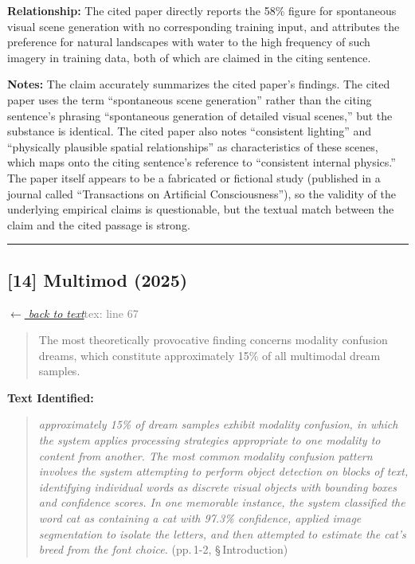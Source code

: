 \smallskip
\noindent \textbf{Relationship:} The cited paper directly reports the 58\% figure for spontaneous visual scene generation with no corresponding training input, and attributes the preference for natural landscapes with water to the high frequency of such imagery in training data, both of which are claimed in the citing sentence.

\smallskip
\noindent \textbf{Notes:} The claim accurately summarizes the cited paper's findings. The cited paper uses the term ``spontaneous scene generation'' rather than the citing sentence's phrasing ``spontaneous generation of detailed visual scenes,'' but the substance is identical. The cited paper also notes ``consistent lighting'' and ``physically plausible spatial relationships'' as characteristics of these scenes, which maps onto the citing sentence's reference to ``consistent internal physics.'' The paper itself appears to be a fabricated or fictional study (published in a journal called ``Transactions on Artificial Consciousness''), so the validity of the underlying empirical claims is questionable, but the textual match between the claim and the cited passage is strong.

\medskip
\noindent\rule{\textwidth}{0.2pt}
\medskip
\subsection*{[14] Multimod (2025)}
\hypertarget{appendix:group_67_147}{}

\noindent \hyperlink{claim:group_67_147}{\textit{$\leftarrow$ back to text}}\hfill \textcolor{gray}{tex: line 67}
\smallskip

\begin{quote}
The most theoretically provocative finding concerns modality confusion dreams, which constitute approximately 15\% of all multimodal dream samples.
\end{quote}
\noindent{}
\smallskip

\noindent \textbf{Text Identified:}
\begin{quote}
\textit{approximately 15\% of dream samples exhibit modality confusion, in which the system applies processing strategies appropriate to one modality to content from another. The most common modality confusion pattern involves the system attempting to perform object detection on blocks of text, identifying individual words as discrete visual objects with bounding boxes and confidence scores. In one memorable instance, the system classified the word cat as containing a cat with 97.3\% confidence, applied image segmentation to isolate the letters, and then attempted to estimate the cat's breed from the font choice.} (pp.\,1-2, \S\,Introduction)
\end{quote}

